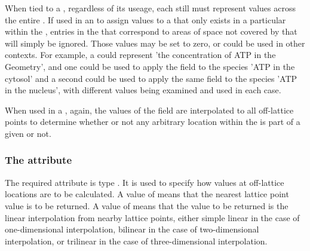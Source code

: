 When tied to a \SpatialSymbolReference, regardless of its useage, each \SampledField still must represent values across the entire \Geometry.  If used in an \InitialAssignment to assign values to a \Species that only exists in a particular \DomainType within the \Geometry, entries in the \SampledField that correspond to areas of space not covered by that \DomainType will simply be ignored.  Those values may be set to zero, or could be used in other contexts.  For example, a \SampledField could represent 'the concentration of ATP in the Geometry', and one \InitialAssignment could be used to apply the field to the species 'ATP in the cytosol' and a second \InitialAssignment could be used to apply the same field to the species 'ATP in the nucleus', with different values being examined and used in each case.

When used in a \SampledFieldGeometry, again, the values of the field are interpolated to all off-lattice points to determine whether or not any arbitrary location within the \Geometry is part of a given \SampledVolume or not.


\subsubsection{The \fixttspace{} attribute}
The required  attribute is type . It is used to specify how values at off-lattice locations are to be calculated.  A value of  means that the nearest lattice point value is to be returned.  A value of  means that the value to be returned is the linear interpolation from nearby lattice points, either simple linear in the case of one-dimensional interpolation, bilinear in the case of two-dimensional interpolation, or trilinear in the case of three-dimensional interpolation.


